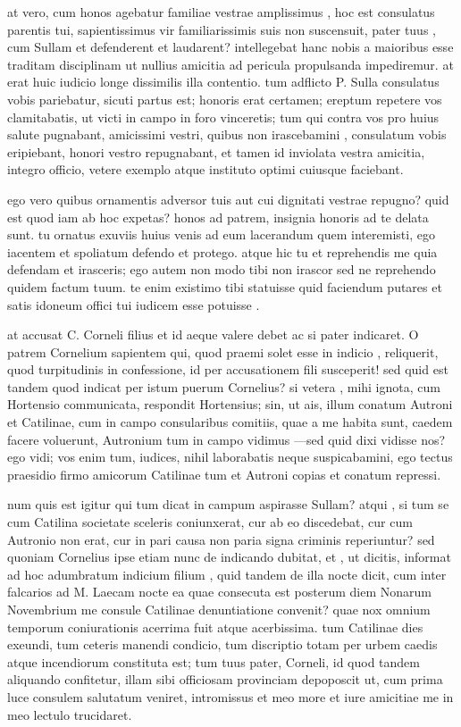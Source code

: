  at vero, cum honos agebatur familiae vestrae amplissimus , hoc est consulatus parentis tui, sapientissimus vir familiarissimis suis non suscensuit, pater tuus , cum Sullam et defenderent et laudarent? intellegebat hanc nobis a maioribus esse traditam disciplinam ut nullius amicitia ad pericula propulsanda impediremur. at erat huic iudicio longe dissimilis illa contentio. tum adflicto P. Sulla consulatus vobis pariebatur, sicuti partus est; honoris erat certamen; ereptum repetere vos clamitabatis, ut victi in campo in foro vinceretis; tum qui contra vos pro huius salute pugnabant, amicissimi vestri, quibus non irascebamini , consulatum vobis eripiebant, honori vestro repugnabant, et tamen id inviolata vestra amicitia, integro officio, vetere exemplo atque instituto optimi cuiusque faciebant.

 ego vero quibus ornamentis adversor tuis aut cui dignitati vestrae repugno? quid est quod iam ab hoc expetas? honos ad patrem, insignia honoris ad te delata sunt. tu ornatus exuviis huius venis ad eum lacerandum quem interemisti, ego iacentem et spoliatum defendo et protego. atque hic tu et reprehendis me quia defendam et irasceris; ego autem non modo tibi non irascor sed ne reprehendo quidem factum tuum. te enim existimo tibi statuisse quid faciendum putares et satis idoneum offici tui iudicem esse potuisse .

 at accusat C. Corneli filius et id aeque valere debet ac si pater indicaret. O patrem Cornelium sapientem qui, quod praemi solet esse in indicio , reliquerit, quod turpitudinis in confessione, id per accusationem fili susceperit! sed quid est tandem quod indicat per istum puerum Cornelius? si vetera , mihi ignota, cum Hortensio communicata, respondit Hortensius; sin, ut ais, illum conatum Autroni et Catilinae, cum in campo consularibus comitiis, quae a me habita sunt, caedem facere voluerunt, Autronium tum in campo vidimus —sed quid dixi vidisse nos? ego vidi; vos enim tum, iudices, nihil laborabatis neque suspicabamini, ego tectus praesidio firmo amicorum Catilinae tum et Autroni copias et conatum repressi.

 num quis est igitur qui tum dicat in campum aspirasse Sullam? atqui , si tum se cum Catilina societate sceleris coniunxerat, cur ab eo discedebat, cur cum Autronio non erat, cur in pari causa non paria signa criminis reperiuntur? sed quoniam Cornelius ipse etiam nunc de indicando dubitat, et , ut dicitis, informat ad hoc adumbratum indicium filium , quid tandem de illa nocte dicit, cum inter falcarios ad M. Laecam nocte ea quae consecuta est posterum diem Nonarum Novembrium me consule Catilinae denuntiatione convenit? quae nox omnium temporum coniurationis acerrima fuit atque acerbissima. tum Catilinae dies exeundi, tum ceteris manendi condicio, tum discriptio totam per urbem caedis atque incendiorum constituta est; tum tuus pater, Corneli, id quod tandem aliquando confitetur, illam sibi officiosam provinciam depoposcit ut, cum prima luce consulem salutatum veniret, intromissus et meo more et iure amicitiae me in meo lectulo trucidaret.

